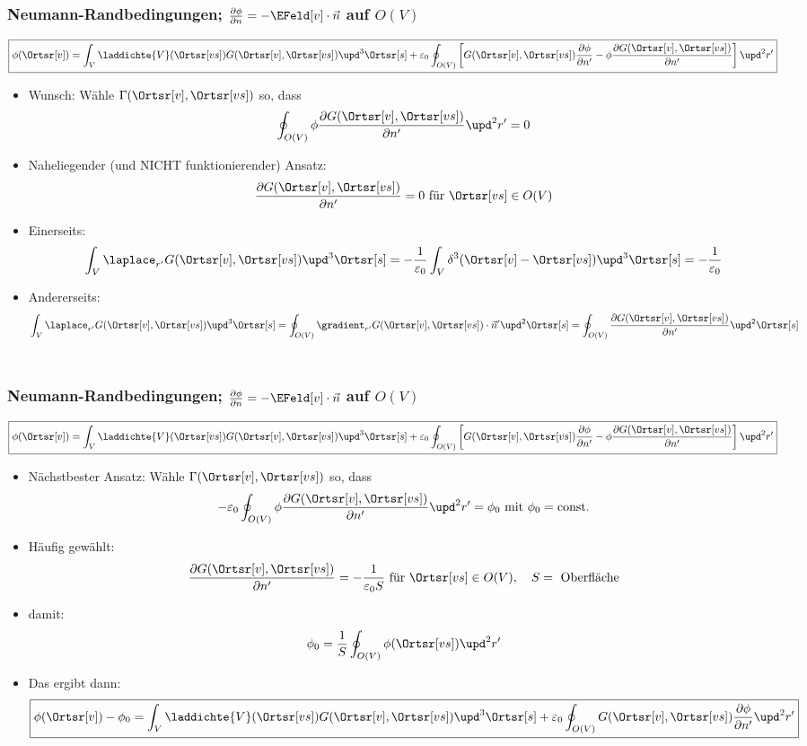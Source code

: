 \begin{frame}
  \frametitle{Neumann-Randbedingungen; $\frac{\partial \phi}{\partial n}=-\EFeld[v]\cdot\vec{n}$ auf $O(V)$}
       $$
      \boxed{ \phi(\Ortsr[v]) = \int_V
   \laddichte{V}(\Ortsr[vs]) G(\Ortsr[v],\Ortsr[vs]) \upd^3\Ortsr[s] + \varepsilon_0 \oint_{O(V)} \left[ G(\Ortsr[v],\Ortsr[vs]) \frac{\partial\phi}{\partial n'} - \phi\frac{\partial G(\Ortsr[v],\Ortsr[vs])}{\partial n'}\right] \upd^2r'}
 $$
 \begin{itemize}
 \item<2-> Wunsch: Wähle $\Gamma(\Ortsr[v],\Ortsr[vs])$ so, dass
   $$
   \oint_{O(V)} \phi\frac{\partial G(\Ortsr[v],\Ortsr[vs])}{\partial n'} \upd^2r' = 0
   $$
 \item<3-> Naheliegender (und NICHT funktionierender) Ansatz:
   $$
   \frac{\partial G(\Ortsr[v],\Ortsr[vs])}{\partial n'} = 0 \text{ für } \Ortsr[vs] \in O(V) 
   $$
 \item<4-> Einerseits:
   $$
   \int_V \laplace_{r'}G(\Ortsr[v],\Ortsr[vs]) \upd^3\Ortsr[s] = -\frac{1}{\varepsilon_0} \int_V \delta^3(\Ortsr[v]-\Ortsr[vs]) \upd^3\Ortsr[s] = -\frac{1}{\varepsilon_0}  
   $$
 \item<5-> Andererseits:
  $$
   \int_V \laplace_{r'}G(\Ortsr[v],\Ortsr[vs]) \upd^3\Ortsr[s] = \oint_{O(V)} \gradient_{r'}G(\Ortsr[v],\Ortsr[vs]) \cdot\vec{n}' \upd^2\Ortsr[s] = \oint_{O(V)} \frac{\partial G(\Ortsr[v],\Ortsr[vs])}{\partial n'} \upd^2\Ortsr[s]  
   $$
 \ 
\end{itemize}
\end{frame}

\begin{frame}
  \frametitle{Neumann-Randbedingungen; $\frac{\partial \phi}{\partial n}=-\EFeld[v]\cdot\vec{n}$ auf $O(V)$}
       $$
      \boxed{ \phi(\Ortsr[v]) = \int_V
   \laddichte{V}(\Ortsr[vs]) G(\Ortsr[v],\Ortsr[vs]) \upd^3\Ortsr[s] + \varepsilon_0 \oint_{O(V)} \left[ G(\Ortsr[v],\Ortsr[vs]) \frac{\partial\phi}{\partial n'} - \phi\frac{\partial G(\Ortsr[v],\Ortsr[vs])}{\partial n'}\right] \upd^2r'}
 $$
 \begin{itemize}
 \item<2-> Nächstbester Ansatz: Wähle $\Gamma(\Ortsr[v],\Ortsr[vs])$ so, dass
   $$
   -\varepsilon_0 \oint_{O(V)} \phi\frac{\partial G(\Ortsr[v],\Ortsr[vs])}{\partial n'} \upd^2r' = \phi_0 \text{ mit } \phi_0 = \text{const.}
   $$
 \item<3-> Häufig gewählt:
   $$
   \frac{\partial G(\Ortsr[v],\Ortsr[vs])}{\partial n'} = -\frac{1}{\varepsilon_0 S} \text{ für } \Ortsr[vs] \in O(V), \quad S = \text{ Oberfläche} 
   $$
 \item<4-> damit:
   $$
   \phi_0 = \frac{1}{S}\oint_{O(V)} \phi(\Ortsr[vs]) \upd^2r'  
   $$
 \item<5-> Das ergibt dann:
  $$
      \boxed{ \phi(\Ortsr[v]) -\phi_0 = \int_V
   \laddichte{V}(\Ortsr[vs]) G(\Ortsr[v],\Ortsr[vs]) \upd^3\Ortsr[s] + \varepsilon_0 \oint_{O(V)} G(\Ortsr[v],\Ortsr[vs]) \frac{\partial\phi}{\partial n'} \upd^2r'}
 $$
\end{itemize}
\end{frame}

